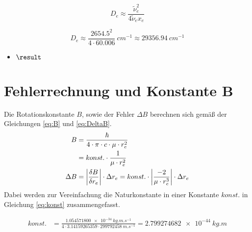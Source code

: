 \begin{equation} 
	\label{eq:de}
		D_e \approx \frac{\tilde{\nu}_e^2}{4 \tilde{\nu}_e x_e}
\end{equation}

\begin{equation} 
	\label{eq:de}
		D_e \approx \frac{2654.5^2}{4\cdot60.006} ~\si
{cm^{-1}}  \approx  \SI[mode=math]{29356.94}{cm^{-1}} 
\end{equation}

\begin{itemize}
 \item {}%
    $\result$
\end{itemize} 
\section{Fehlerrechnung und Konstante B}
Die Rotationskonstante $B$, sowie der Fehler $\Delta B$ berechnen sich gemäß der Gleichungen \ref{eq:B} und \ref{eq:DeltaB}.
\begin{align}
B 	
   			&= \frac{\hbar}{4 \cdot \pi \cdot c \cdot \mu  \cdot r_e^{2}}
   			\notag\\\label{eq:B}
   			&= konst.\cdot\frac{1}{\mu  \cdot r_e^{2}}
   			\\\label{eq:DeltaB}	
\Delta B	
   			&=  \left|\frac{\delta B}{\delta r_e}\right|\cdot\Delta r_e =konst. \cdot\left|\frac{-2}{\mu \cdot r_e^{3}  }\right|\cdot \Delta r_e  	
   			\end{align}
Dabei werden zur Vereinfachung die Naturkonstante in einer Konstante $konst.$ in Gleichung \ref{eq:konst} zusammengefasst.


\begin{align}
\label{eq:konst}
konst.&= 			 \frac{\SI[mode=math]{1.054571800e-34}{kg.m.s^{-1}}}{4\cdot 3.14159265359 \cdot \SI[mode=math]{299792458}{m.s^{-1}}}=\SI[mode=math]{2.799274682e-44}{kg.m}  				
\end{align}

